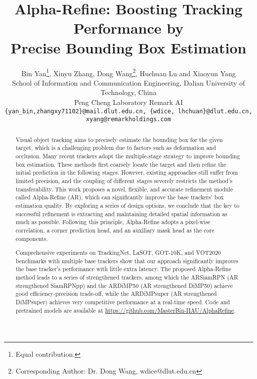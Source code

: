 \documentclass[final]{cvpr}
\newcommand{\ignore}[1]{}
\begin{document}
\title{Alpha-Refine: Boosting Tracking Performance by \\ Precise Bounding Box Estimation}

\author{
Bin Yan\thanks{Equal contribution.}, Xinyu Zhang\footnotemark[1], Dong Wang\thanks{Corresponding Author: Dr. Dong Wang, wdice@dlut.edu.cn},  Huchuan Lu and Xiaoyun Yang\\
School of Information and Communication Engineering, Dalian University of Technology, China\\
Peng Cheng Laboratory
Remark AI\\
{\tt\footnotesize \{yan\_bin,zhangxy71102\}@mail.dlut.edu.cn, 
\{wdice, lhchuan\}@dlut.edu.cn, xyang@remarkholdings.com}
}



\maketitle
\pagestyle{empty}
\thispagestyle{empty}


\begin{abstract}
Visual object tracking aims to precisely estimate the bounding box for the given target, which is a challenging problem due to factors such as deformation and occlusion. Many recent trackers adopt the multiple-stage 
strategy to improve bounding box estimation. These methods first coarsely locate the target and then 
refine the initial prediction in the following stages. However, existing approaches still suffer from limited precision, 
and the coupling of different stages severely restricts the method’s transferability. This work proposes a novel, 
flexible, and accurate refinement module called Alpha-Refine (AR), which can significantly improve the base trackers’ 
box estimation quality. By exploring a series of design options, we conclude that the key to successful refinement is 
extracting and maintaining detailed spatial information as much as possible. Following this principle, Alpha-Refine 
adopts a pixel-wise correlation, a corner prediction head, and an auxiliary mask head as the core components. 
\ignore{We apply Alpha-Refine to six famous base trackers to verify our method’s effectiveness: ECO, RT-MDNet, SiamRPNpp, ATOM, DiMP50, and DiMPsuper.}
Comprehensive experiments on TrackingNet, LaSOT, GOT-10K, and VOT2020 benchmarks with multiple base trackers show that our approach significantly improves the base tracker’s performance with little extra latency. 
The proposed Alpha-Refine method leads to a series of strengthened trackers, among which the ARSiamRPN (AR strengthened SiamRPNpp) and the ARDiMP50 (AR strengthened DiMP50) achieve good efficiency-precision trade-off, while the ARDiMPsuper (AR strengthened DiMPsuper) achieves very competitive performance at a real-time speed.
Code and pretrained models are available at \href{https://github.com/MasterBin-IIAU/AlphaRefine} {https://github.com/MasterBin-IIAU/AlphaRefine}.
\end{abstract}
\end{document}
